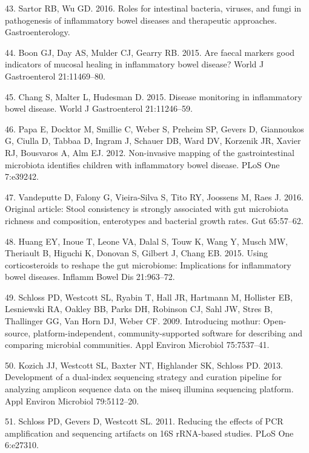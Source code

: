 \documentclass[12pt,]{article}
\begin{document}
\hypertarget{ref-sartor_microbesIBD_2016}{}
43. Sartor RB, Wu GD. 2016. Roles for intestinal bacteria, viruses, and
fungi in pathogenesis of inflammatory bowel diseases and therapeutic
approaches. Gastroenterology.

\hypertarget{ref-boon_fmarkers_2015}{}
44. Boon GJ, Day AS, Mulder CJ, Gearry RB. 2015. Are faecal markers good
indicators of mucosal healing in inflammatory bowel disease? World J
Gastroenterol 21:11469--80.

\hypertarget{ref-chang_monitoring_2015}{}
45. Chang S, Malter L, Hudesman D. 2015. Disease monitoring in
inflammatory bowel disease. World J Gastroenterol 21:11246--59.

\hypertarget{ref-papa_pedsIBD_2012}{}
46. Papa E, Docktor M, Smillie C, Weber S, Preheim SP, Gevers D,
Giannoukos G, Ciulla D, Tabbaa D, Ingram J, Schauer DB, Ward DV,
Korzenik JR, Xavier RJ, Bousvaros A, Alm EJ. 2012. Non-invasive mapping
of the gastrointestinal microbiota identifies children with inflammatory
bowel disease. PLoS One 7:e39242.

\hypertarget{ref-vandeputte_stoolcon_2016}{}
47. Vandeputte D, Falony G, Vieira-Silva S, Tito RY, Joossens M, Raes J.
2016. Original article: Stool consistency is strongly associated with
gut microbiota richness and composition, enterotypes and bacterial
growth rates. Gut 65:57--62.

\hypertarget{ref-huang_cort_2015}{}
48. Huang EY, Inoue T, Leone VA, Dalal S, Touw K, Wang Y, Musch MW,
Theriault B, Higuchi K, Donovan S, Gilbert J, Chang EB. 2015. Using
corticosteroids to reshape the gut microbiome: Implications for
inflammatory bowel diseases. Inflamm Bowel Dis 21:963--72.

\hypertarget{ref-schloss_mothur_2009}{}
49. Schloss PD, Westcott SL, Ryabin T, Hall JR, Hartmann M, Hollister
EB, Lesniewski RA, Oakley BB, Parks DH, Robinson CJ, Sahl JW, Stres B,
Thallinger GG, Van Horn DJ, Weber CF. 2009. Introducing mothur:
Open-source, platform-independent, community-supported software for
describing and comparing microbial communities. Appl Environ Microbiol
75:7537--41.

\hypertarget{ref-Kozich_MiSeqSOP_2013}{}
50. Kozich JJ, Westcott SL, Baxter NT, Highlander SK, Schloss PD. 2013.
Development of a dual-index sequencing strategy and curation pipeline
for analyzing amplicon sequence data on the miseq illumina sequencing
platform. Appl Environ Microbiol 79:5112--20.

\hypertarget{ref-schloss_PCRartifacts_2011}{}
51. Schloss PD, Gevers D, Westcott SL. 2011. Reducing the effects of PCR
amplification and sequencing artifacts on 16S rRNA-based studies. PLoS
One 6:e27310.
\end{document}
